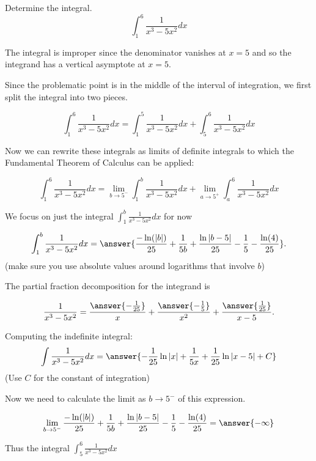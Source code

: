 \documentclass{ximera}
\author{Jason Miller}
\begin{document}
\begin{exercise}
Determine the integral.
\[
\int_{1}^{6} \frac{1}{x^3-5x^2} dx
\]

The integral is improper since the denominator vanishes at $x=5$ and so the integrand has a vertical asymptote at $x=5$. 

Since the problematic point is in the middle of the interval of integration, we first split the integral into two pieces. 

\[
\int _{1}^{6} \frac{1}{x^3-5x^2} dx=\int_{1}^{5} \frac{1}{x^3-5x^2} dx + \int_{5}^{6} \frac{1}{x^3-5x^2} dx
\]

Now we can rewrite these integrals as limits of definite integrals to which the Fundamental Theorem of Calculus can be applied: 

\[
\int_{1}^{6} \frac{1}{x^3-5x^2} dx= \lim_{b \to 5^{-}} \int_{1}^{b} \frac{1}{x^3-5x^2} dx + \lim_{a \to 5^{+}} \int _{a}^{6} 
\frac{1}{x^3-5x^2} dx
\]


We focus on just the integral $\int_{1}^{b} \frac{1}{x^3-5x^2} dx$ for now

\[
\int_{1}^{b} \frac{1}{x^3-5x^2} dx=\answer{  \frac{-\ln(|b|)}{25} +\frac{1}{5b} + \frac{\ln|b-5|}{25}-\frac{1}{5}-\frac{\ln(4)}{25}  }.
\]
(make sure you use absolute values around logarithms that involve $b$)

\begin{hint}
The partial fraction decomposition for the integrand is

\[
\frac{1}{x^3-5x^2} = \frac{\answer{-\frac{1}{25}}}{x}+ \frac{\answer{-\frac{1}{5}}}{x^2}+\frac{\answer{\frac{1}{25}}}{x-5}.
\]
\begin{question}
Computing the indefinite integral:
\[
\int \frac{1}{x^3-5x^2} dx = \answer{-\frac{1}{25} \ln|x| + \frac{1}{5x} +\frac{1}{25} \ln|x-5|+C}
\]
(Use $C$ for the constant of integration)
\end{question}
\end{hint}

\begin{exercise}
Now we need to calculate the limit as $b \to 5^{-}$ of this expression. 

\[
\lim_{b \to 5^{-}}  \frac{-\ln(|b|)}{25} +\frac{1}{5b} + \frac{\ln|b-5|}{25}-\frac{1}{5}-\frac{\ln(4)}{25} =\answer{ -\infty}
\]

\begin{exercise}
Thus the integral $\int_{5}^{6} \frac{1}{x^3-5x^2} dx$

\begin{multipleChoice}
\end{multipleChoice}


\end{exercise}
\end{exercise}
\end{exercise}
\end{document}
